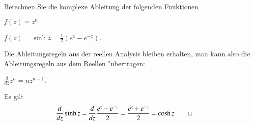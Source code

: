 Berechnen Sie die komplexe Ableitung der folgenden Funktionen
\begin{teilaufgaben}
\item $f(z)=z^n$
\item $f(z)=\operatorname{sinh}z=\frac12(e^z-e^{-z})$.
\end{teilaufgaben}

\begin{loesung}
Die Ableitungsregeln aus der reellen Analysis bleiben erhalten,
man kann also die Ableitungsregeln aus dem Reellen "ubertragen:
\begin{teilaufgaben}
\item $\displaystyle\frac{d}{dz}z^n=nz^{n-1}$.
\item Es gilt
\begin{align*}
\frac{d}{dz}\operatorname{sinh}z
&=
\frac{d}{dz}\frac{e^z-e^{-z}}2
=
\frac{e^z+e^{-z}}2=\operatorname{cosh}z
\qedhere
\end{align*}
\end{teilaufgaben}
\end{loesung}

